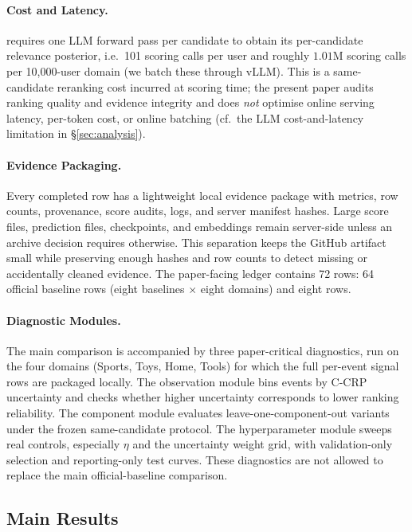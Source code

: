 \paragraph{Cost and Latency.} \method{} requires one LLM forward pass per
candidate to obtain its per-candidate relevance posterior, i.e.\ 101 scoring
calls per user and roughly $1.01$M scoring calls per 10,000-user domain (we
batch these through vLLM). This is a same-candidate reranking cost incurred at
scoring time; the present paper audits ranking quality and evidence integrity
and does \emph{not} optimise online serving latency, per-token cost, or online
batching (cf.\ the LLM cost-and-latency limitation in \S\ref{sec:analysis}).

\paragraph{Evidence Packaging.} Every completed row has a lightweight local
evidence package with metrics, row counts, provenance, score audits, logs, and
server manifest hashes. Large score files, prediction files, checkpoints, and
embeddings remain server-side unless an archive decision requires otherwise.
This separation keeps the GitHub artifact small while preserving enough hashes
and row counts to detect missing or accidentally cleaned evidence. The
paper-facing ledger contains 72 rows: 64 official baseline rows (eight
baselines $\times$ eight domains) and eight \method{} rows.

\paragraph{Diagnostic Modules.} The main comparison is accompanied by three
paper-critical diagnostics, run on the four domains (Sports, Toys, Home, Tools)
for which the full per-event signal rows are packaged locally. The observation
module bins events by C-CRP uncertainty and checks whether higher uncertainty
corresponds to lower ranking reliability. The component module evaluates
leave-one-component-out variants under the frozen same-candidate protocol. The
hyperparameter module sweeps real controls, especially $\eta$ and the
uncertainty weight grid, with validation-only selection and reporting-only test
curves. These diagnostics are not allowed to replace the main official-baseline
comparison.

\subsection{Main Results}


